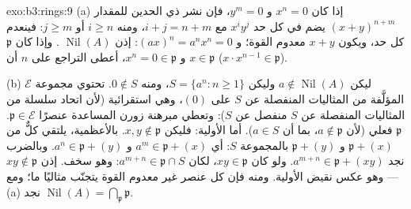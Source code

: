 \begin{solution}{exo:b3:rings:9}
(a) إذا كان $x^n = 0$ و $y^m = 0$، فإن نشر ذي الحدين للمقدار
$(x+y)^{n+m}$ يضم في كل حد $x^iy^j$ مع $i + j = n + m$، ومنه
$i
\geq n$ أو $j \geq m$: فينعدم كل حد، ويكون $x + y$ معدوم القوة؛
و $(ax)^n = a^nx^n = 0$: إذن $\operatorname{Nil}(A)$ . وإذا كان $\mathfrak p$ 
و $x^n = 0 \in \mathfrak p$، أعطى التراجع على $n$ أن $x \in \mathfrak p$ ($x \cdot x^{n-1} \in
\mathfrak p$).

(b) ليكن $a \notin \operatorname{Nil}(A)$ وليكن $S = \{a^n : n \geq
1\}$، ومنه $0 \notin S$. تحتوي مجموعة
$\mathcal E$ المؤلَّفة من المثاليات المنفصلة عن $S$ على $(0)$،
وهي استقرائية (لأن اتحاد سلسلة من المثاليات المنفصلة عن $S$
 منفصل عن $S$): وتعطي مبرهنة زورن المساعدة عنصرًا 
$\mathfrak p \in \mathcal E$.  $\mathfrak p$ فعلي (لأن $a \notin \mathfrak p$، بما أن
$a \in S$). أما الأولية: فليكن $x, y \notin \mathfrak p$. بالأعظمية، يلتقي كلٌّ
من $\mathfrak p + (x)$ و $\mathfrak p + (y)$ بالمجموعة $S$: أي $a^m \in \mathfrak p + (x)$ و $a^n
\in \mathfrak p + (y)$.
وبالضرب نجد $a^{m+n} \in \mathfrak p +
(xy)$. ولو كان $xy \in \mathfrak p$، لكان $a^{m+n} \in \mathfrak p \cap
S$: وهو سخف.
إذن $xy \notin \mathfrak p$ --- وهو عكس نقيض الأولية. ومنه فإن كل عنصر غير
معدوم القوة يتجنّب مثاليًا  ما؛ ومع (a) نجد
$\operatorname{Nil}(A) = \bigcap_{\mathfrak p} \mathfrak p$.
\end{solution}

